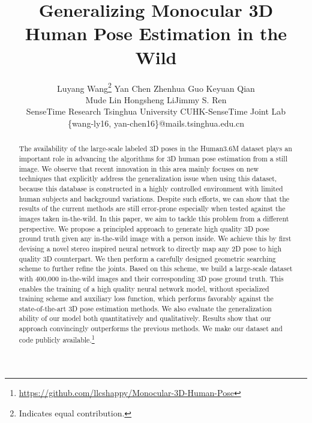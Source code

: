 \documentclass[10pt,twocolumn,letterpaper]{article}
\begin{document}
\title{Generalizing Monocular 3D Human Pose Estimation in the Wild}

\author{Luyang Wang\thanks{Indicates equal contribution.} \quad Yan Chen \quad Zhenhua Guo \quad Keyuan Qian \\ Mude Lin \quad Hongsheng Li\quad Jimmy S. Ren
\\ SenseTime Research \quad Tsinghua University \quad CUHK-SenseTime Joint Lab\\
\{wang-ly16, yan-chen16\}@mails.tsinghua.edu.cn}


\maketitle



\begin{abstract}
The availability of the large-scale labeled 3D poses in the Human3.6M dataset plays an important role in advancing the algorithms for 3D human pose estimation from a still image. 
We observe that recent innovation in this area mainly focuses on new techniques that explicitly address the generalization issue when using this dataset, because this database is constructed in a highly controlled environment with limited human subjects and background variations.
Despite such efforts, we can show that the results of the current methods are still error-prone especially when tested against the images taken in-the-wild. 
In this paper, we aim to tackle this problem from a different perspective. 
We propose a principled approach to generate high quality 3D pose ground truth given any in-the-wild image with a person inside. We achieve this by first devising a novel stereo inspired neural network to directly map any 2D pose to high quality 3D counterpart. 
We then perform a carefully designed geometric searching scheme to further refine the joints. 
Based on this scheme, we build a large-scale dataset with 400,000 in-the-wild images and their corresponding 3D pose ground truth. 
This enables the training of a high quality neural network model, without specialized training scheme and auxiliary loss function, which performs favorably against the state-of-the-art 3D pose estimation methods. 
We also evaluate the generalization ability of our model both quantitatively and qualitatively. 
Results show that our approach convincingly outperforms the previous methods. 
We make our dataset and code publicly available.\footnote{\url{https://github.com/llcshappy/Monocular-3D-Human-Pose}}
\end{abstract}
\end{document}
